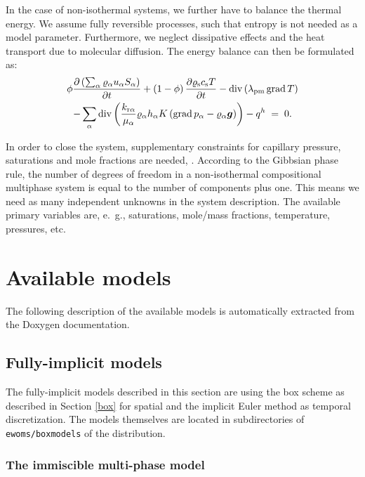 In the case of non-isothermal systems, we further have to balance the
thermal energy. We assume fully reversible processes, such that entropy
is not needed as a model parameter. Furthermore, we neglect 
dissipative effects and the heat transport due to molecular
diffusion. The energy balance can then be
formulated as:
%
\begin{multline}
  \label{A3:eqenergmak1}
  \phi \frac{\partial \left( \sum_\alpha \varrho_{\alpha}
      u_\alpha S_\alpha \right)}{\partial t} + \left( 1 -
    \phi \right) \frac{\partial \varrho_{\text{s}} c_{\text{s}}
    T}{\partial t}  
 - \operatorname{div} \left( \lambda_{\text{pm}} \operatorname{grad} T \right)
   \\
   - \sum\limits_\alpha \operatorname{div} \left( \frac{k_{\text{r}
        \alpha}}{\mu_\alpha} \varrho_{\alpha} h_\alpha
    K \left( \operatorname{grad} p_\alpha - \varrho_{\alpha}
      \boldsymbol{g} \right) \right)  
 - q^h \; = \; 0.
\end{multline}

In order to close the system, supplementary constraints for capillary pressure, saturations and mole
fractions are needed, \cite{A3:helmig:1997}. 
According to the Gibbsian phase rule, the number of degrees of freedom
in a non-isothermal compositional multiphase system is equal to the
number of components plus one. This means we need as many independent
unknowns in the system description. The
available primary variables are, e.\ g., saturations, mole/mass
fractions, temperature, pressures, etc.




\section{Available models} 
The following description of the available models is automatically extracted 
from the Doxygen documentation.

\subsection{Fully-implicit models} 

The fully-implicit models described in this section are using the box
scheme as described in Section \ref{box} for spatial and the implicit Euler
method as temporal discretization. The models themselves are located in
subdirectories of \texttt{ewoms/boxmodels} of the \eWoms distribution.

\subsubsection{The immiscible multi-phase model} 


